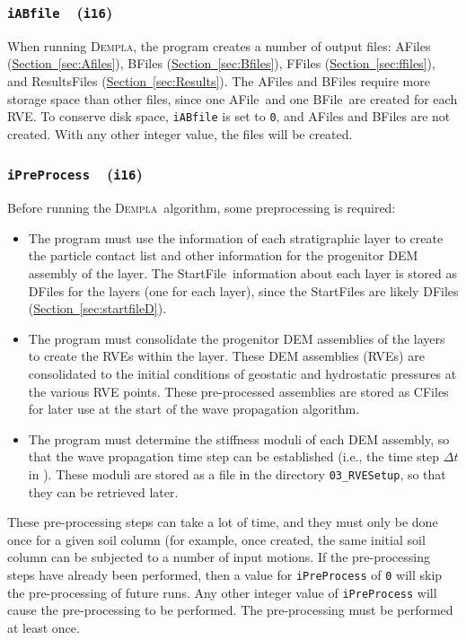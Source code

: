 \documentclass[letterpaper,11pt]{article}
\newcommand{\Dempla}{\textsc{Dempla}}
\newcommand{\Var}[2]{\texttt{#1}\ \  (\texttt{#2})}
\newcommand{\StartFile}{\textsf{StartFile}}
\newcommand{\AFile}{\textsf{AFile}}
\newcommand{\BFile}{\textsf{BFile}}
\newcommand{\CFile}{\textsf{CFile}}
\newcommand{\DFile}{\textsf{DFile}}
\newcommand{\FFile}{\textsf{FFile}}
\newcommand{\ResultsFile}{\textsf{ResultsFile}}
\begin{document}
\subsubsection[\texttt{iABfile}]{\Var{iABfile}{i16}}\label{sec:iABfile}
When running \Dempla,
the program creates a number of output files:
\AFile s (\hyperref[sec:Afiles]{Section~\ref*{sec:Afiles}}),
\BFile s (\hyperref[sec:Bfiles]{Section~\ref*{sec:Bfiles}}),
\FFile s (\hyperref[sec:ffiles]{Section~\ref*{sec:ffiles}}), and
\ResultsFile s (\hyperref[sec:Results]{Section~\ref*{sec:Results}}).
The \AFile s and \BFile s require more
storage space than other files,
since one \AFile\ and one \BFile\ are created for each RVE.
To conserve disk space,
\texttt{iABfile} is set to \texttt{0},
and \AFile s and \BFile s are not created.
With any other integer value, the files will be created.
%
\subsubsection[\texttt{iPreProcess}]{\Var{iPreProcess}{i16}}\label{sec:iPreProcess}
Before running the \Dempla\ algorithm,
some preprocessing is required:
\begin{itemize}
  \item
    The program must use the information of each stratigraphic
    layer to create the particle contact list and other information for
    the progenitor DEM assembly of the layer.
    The \StartFile\ information about
    each layer is stored as \DFile s for the layers
    (one for each layer),
    since the \StartFile s are likely \DFile s
    (\hyperref[sec:startfileD]{Section~\ref*{sec:startfileD}}).
  \item 
     The program must consolidate the progenitor DEM assemblies
     of the layers to create the RVEs within the layer.
     These DEM assemblies (RVEs) are consolidated to the initial
     conditions of geostatic and hydrostatic pressures at the
     various RVE points.
     These pre-processed assemblies are stored as \CFile s
     for later use at the start of the wave propagation algorithm.
   \item
     The program must determine the stiffness moduli of each
     DEM assembly, so that the wave propagation time step
     can be established (i.e., the time step $\Delta t$
     in \citep{Kuhn:2021a}).
     These moduli are stored as a file in the directory
     \texttt{03\_RVESetup}, so that they can be retrieved later.
\end{itemize}
%
These pre-processing steps can take a lot of time, and they
must only be done once for a given soil column
(for example, once created, the same initial soil column
can be subjected to a number of input motions.
If the pre-processing steps have already been performed,
then a value for \texttt{iPreProcess} of \texttt{0} will
skip the pre-processing of future runs.
Any other integer value of \texttt{iPreProcess} will cause
the pre-processing to be performed.
The pre-processing must be performed at least once.
%
\end{document}
